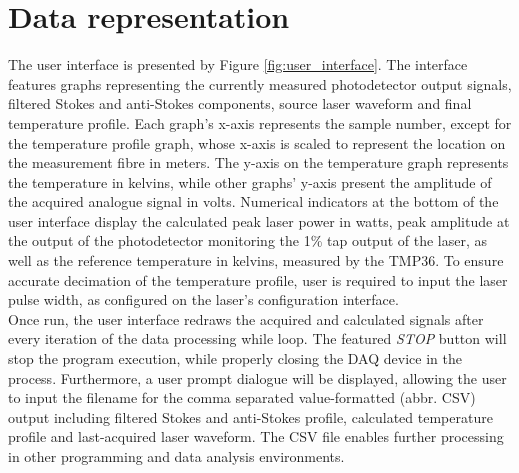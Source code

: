 \documentclass{standalone}
\begin{document}
\section{Data representation}

The user interface is presented by Figure \ref{fig:user_interface}. The interface features graphs representing the currently measured photodetector output signals, filtered Stokes and anti-Stokes components, source laser waveform and final temperature profile. Each graph's x-axis represents the sample number, except for the temperature profile graph, whose x-axis is scaled to represent the location on the measurement fibre in meters. The y-axis on the temperature graph represents the temperature in kelvins, while other graphs' y-axis present the amplitude of the acquired analogue signal in volts. Numerical indicators at the bottom of the user interface display the calculated peak laser power in watts, peak amplitude at the output of the photodetector monitoring the 1\% tap output of the laser, as well as the reference temperature in kelvins, measured by the TMP36. To ensure accurate decimation of the temperature profile, user is required to input the laser pulse width, as configured on the laser's configuration interface. \\

Once run, the user interface redraws the acquired and calculated signals after every iteration of the data processing while loop. The featured \textit{STOP} button will stop the program execution, while properly closing the DAQ device in the process. Furthermore, a user prompt dialogue will be displayed, allowing the user to input the filename for the comma separated value-formatted (abbr. CSV) output including filtered Stokes and anti-Stokes profile, calculated temperature profile and last-acquired laser waveform. The CSV file enables further processing in other programming and data analysis environments.


\setcounter{stranica}{\thepage}
\addtocounter{stranica}{1}
\end{document}
